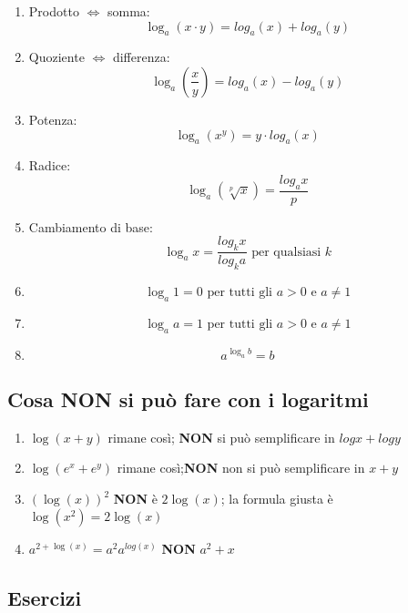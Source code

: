 \begin{minipage}{\textwidth}
\begin{enumerate}

\item Prodotto $\Leftrightarrow$ somma:
\[
\log_a(x\cdot y)=log_a(x) + log_a(y)
\]

\item Quoziente $\Leftrightarrow$ differenza:
\[
\log_a\left(\frac{x}{y}\right)=log_a(x) - log_a(y)
\]

\item Potenza:
\[
\log_a\left(x^y\right)=y \cdot log_a(x)
\]

\item Radice:
\[
\log_a\left(\sqrt[p]{x}\right)=\frac{log_ax}{p}
\]

\item Cambiamento di base:
\[
\log_ax=\frac{log_kx}{log_ka}\textrm{ per qualsiasi }k
\]


\item 
\[
\log_a1=0\textrm{ per tutti gli }a>0\textrm{ e }a\neq 1
\]



\item 
\[
\log_aa=1\textrm{ per tutti gli }a>0\textrm{ e }a\neq 1
\]


\item 
\[
a^{\log_ab}=b
\]


\end{enumerate}

\end{minipage}

\subsection{Cosa \textbf{NON} si può fare con i logaritmi}

\begin{enumerate}
\item $\log(x + y)$ rimane così; \textbf{NON} si può semplificare in $log x + log y$
\item $\log(e^x+e^y)$ rimane così;\textbf{NON} non si può semplificare in $x + y$
\item $(\log(x))^2$ \textbf{NON} è $2\log(x)$; la formula giusta è $\log(x^2)=2\log(x)$
\item $a^{2+\log(x)}=a^2a^{log(x)}$ \textbf{NON} $a^2+x$
\end{enumerate}

\subsection{Esercizi}
